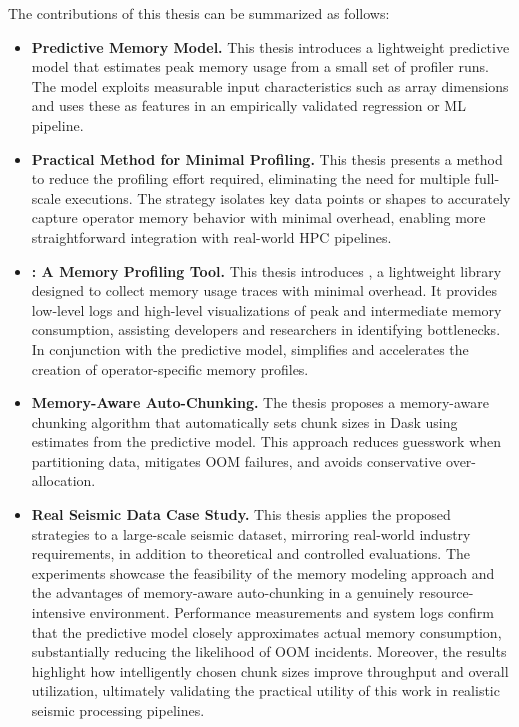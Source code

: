 The contributions of this thesis can be summarized as follows:
\begin{itemize}
    \item \textbf{Predictive Memory Model.}
    This thesis introduces a lightweight predictive model that estimates peak memory usage from a small set of profiler runs.
    The model exploits measurable input characteristics such as array dimensions and uses these as features in an empirically validated regression or \ac{ML} pipeline.

    \item \textbf{Practical Method for Minimal Profiling.}
    This thesis presents a method to reduce the profiling effort required, eliminating the need for multiple full-scale executions.
    The strategy isolates key data points or shapes to accurately capture operator memory behavior with minimal overhead, enabling more straightforward integration with real-world \ac{HPC} pipelines.

    \item \textbf{\traceq: A Memory Profiling Tool.}
    This thesis introduces \traceq, a lightweight library designed to collect memory usage traces with minimal overhead.
    It provides low-level logs and high-level visualizations of peak and intermediate memory consumption, assisting developers and researchers in identifying bottlenecks.
    In conjunction with the predictive model, \traceq simplifies and accelerates the creation of operator-specific memory profiles.

    \item \textbf{Memory-Aware Auto-Chunking.}
    The thesis proposes a memory-aware chunking algorithm that automatically sets chunk sizes in Dask using estimates from the predictive model.
    This approach reduces guesswork when partitioning data, mitigates \ac{OOM} failures, and avoids conservative over-allocation.

    \item \textbf{Real Seismic Data Case Study.}
    This thesis applies the proposed strategies to a large-scale seismic dataset, mirroring real-world industry requirements, in addition to theoretical and controlled evaluations.
    The experiments showcase the feasibility of the memory modeling approach and the advantages of memory-aware auto-chunking in a genuinely resource-intensive environment.
    Performance measurements and system logs confirm that the predictive model closely approximates actual memory consumption, substantially reducing the likelihood of \ac{OOM} incidents.
    Moreover, the results highlight how intelligently chosen chunk sizes improve throughput and overall utilization, ultimately validating the practical utility of this work in realistic seismic processing pipelines.
\end{itemize}

